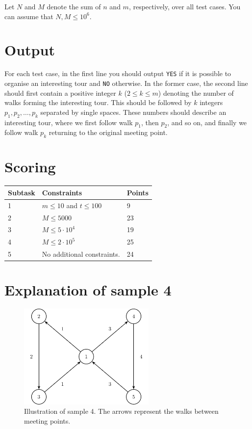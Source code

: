 Let $N$ and $M$ denote the sum of $n$ and $m$, respectively, over all test cases. You can assume that $N, M \leq 10^{6}$.

\section*{Output}
For each test case, in the first line you should output \texttt{YES} if it is possible to organise an interesting tour
and \texttt{NO} otherwise. In the former case, the second line should first contain a positive integer $k$ ($2\leq k\leq m$) denoting
the number of walks forming the interesting tour. This should be followed by $k$ integers
$p_{1}, p_{2}, \ldots, p_{k}$
separated by single spaces. These numbers should describe an interesting tour, where we first follow walk
$p_{1}$, then $p_{2}$, and so on, and finally we follow walk $p_{k}$ returning to the original meeting point.

\section*{Scoring}
\begin{center}
\begin{tabular}{|l|l|l|}
\hline
\textbf{Subtask} & \textbf{Constraints} & \textbf{Points} \\\hline
1 & $m \leq 10$ and $t \leq 100$ & 9 \\\hline
2 & $M \leq 5000$ & 23 \\\hline
3 & $M \leq 5 \cdot 10^{4}$ & 19 \\\hline
4 & $M \leq 2 \cdot 10^{5}$ & 25 \\\hline
5 & No additional constraints. & 24 \\\hline
\end{tabular}
\end{center}

\section*{Explanation of sample 4}
\begin{figure}[h!]
    \centering
    \includegraphics[width=0.6\textwidth]{sample.pdf}
    \caption{Illustration of sample 4. The arrows represent the walks between meeting points.}
\end{figure}
